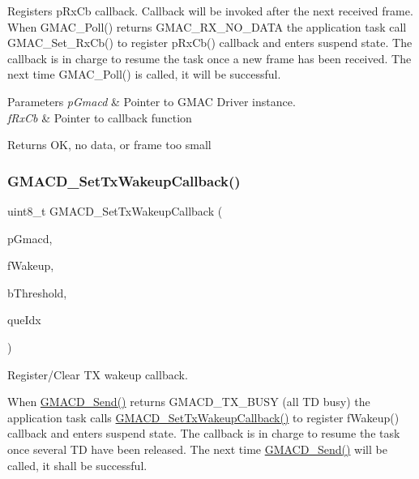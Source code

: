 Registers p\+Rx\+Cb callback. Callback will be invoked after the next received frame. When G\+M\+A\+C\+\_\+\+Poll() returns G\+M\+A\+C\+\_\+\+R\+X\+\_\+\+N\+O\+\_\+\+D\+A\+TA the application task call G\+M\+A\+C\+\_\+\+Set\+\_\+\+Rx\+Cb() to register p\+Rx\+Cb() callback and enters suspend state. The callback is in charge to resume the task once a new frame has been received. The next time G\+M\+A\+C\+\_\+\+Poll() is called, it will be successful. 


\begin{DoxyParams}{Parameters}
{\em p\+Gmacd} & Pointer to G\+M\+AC Driver instance. \\
\hline
{\em f\+Rx\+Cb} & Pointer to callback function \\
\hline
\end{DoxyParams}
\begin{DoxyReturn}{Returns}
OK, no data, or frame too small 
\end{DoxyReturn}
\mbox{\label{group__gmacd__functions_ga0806a8a23ffb3180d3404ec6d7fbfa1d}} 
\subsubsection{\texorpdfstring{GMACD\_SetTxWakeupCallback()}{GMACD\_SetTxWakeupCallback()}}
{\footnotesize\ttfamily uint8\+\_\+t G\+M\+A\+C\+D\+\_\+\+Set\+Tx\+Wakeup\+Callback (\begin{DoxyParamCaption}\item[{\mbox{\hyperlink{group__gmacd__types_gaa8760917079000a5ee7fbc7fab992dd3}{s\+Gmacd}} $\ast$}]{p\+Gmacd,  }\item[{\mbox{\hyperlink{group__gmacd__types_ga44e6be4bb53db0660baf6cb50b20a684}{f\+Gmacd\+Wakeup\+Callback}}}]{f\+Wakeup,  }\item[{uint8\+\_\+t}]{b\+Threshold,  }\item[{gmac\+Que\+List\+\_\+t}]{que\+Idx }\end{DoxyParamCaption})}

Register/\+Clear TX wakeup callback.

When \mbox{\hyperlink{group__gmacd__defines_ga2f3e029556b9627258a2eb1dc4919d95}{G\+M\+A\+C\+D\+\_\+\+Send()}} returns G\+M\+A\+C\+D\+\_\+\+T\+X\+\_\+\+B\+U\+SY (all TD busy) the application task calls \mbox{\hyperlink{group__gmacd__defines_ga0806a8a23ffb3180d3404ec6d7fbfa1d}{G\+M\+A\+C\+D\+\_\+\+Set\+Tx\+Wakeup\+Callback()}} to register f\+Wakeup() callback and enters suspend state. The callback is in charge to resume the task once several TD have been released. The next time \mbox{\hyperlink{group__gmacd__defines_ga2f3e029556b9627258a2eb1dc4919d95}{G\+M\+A\+C\+D\+\_\+\+Send()}} will be called, it shall be successful.

